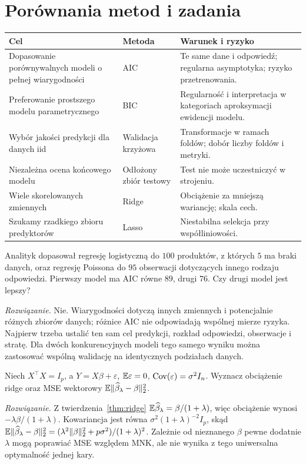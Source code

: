 \section{Porównania metod i zadania}
\begin{center}\small
\begin{tabular}{>{\raggedright\arraybackslash}p{}>{\raggedright\arraybackslash}p{}>{\raggedright\arraybackslash}p{}}
\toprule
\textbf{Cel} & \textbf{Metoda} & \textbf{Warunek i ryzyko}\\
\midrule
Dopasowanie porównywalnych modeli o pełnej wiarygodności & AIC & Te same dane i odpowiedź; regularna asymptotyka; ryzyko przetrenowania.\\
Preferowanie prostszego modelu parametrycznego & BIC & Regularność i interpretacja w kategoriach aproksymacji ewidencji modelu.\\
Wybór jakości predykcji dla danych iid & Walidacja krzyżowa & Transformacje w ramach foldów; dobór liczby foldów i metryki.\\
Niezależna ocena końcowego modelu & Odłożony zbiór testowy & Test nie może uczestniczyć w strojeniu.\\
Wiele skorelowanych zmiennych & Ridge & Obciążenie za mniejszą wariancję; skala cech.\\
Szukamy rzadkiego zbioru predyktorów & Lasso & Niestabilna selekcja przy współliniowości.\\
\bottomrule
\end{tabular}
\end{center}

\begin{zadanie}
Analityk dopasował regresję logistyczną do $100$ produktów,
z których $5$ ma braki danych, oraz regresję Poissona do
$95$ obserwacji dotyczących innego rodzaju odpowiedzi.
Pierwszy model ma AIC równe $89$, drugi $76$. Czy drugi
model jest lepszy?
\par\emph{Rozwiązanie.} Nie. Wiarygodności dotyczą innych
zmiennych i potencjalnie różnych zbiorów danych;
różnice AIC nie odpowiadają wspólnej mierze ryzyka.
Najpierw trzeba ustalić ten sam cel predykcji, rozkład
odpowiedzi, obserwacje i stratę. Dla dwóch konkurencyjnych
modeli tego samego wyniku można zastosować wspólną
walidację na identycznych podziałach danych.
\end{zadanie}

\begin{zadanie}
Niech $X^\top X=I_p$, a $Y=X\beta+\varepsilon$,
$\mathbb E\varepsilon=0$, $\operatorname{Cov}(\varepsilon)=\sigma^2I_n$.
Wyznacz obciążenie ridge oraz MSE wektorowy
$\mathbb E\|\widehat\beta_\lambda-\beta\|_2^2$.
\par\emph{Rozwiązanie.} Z twierdzenia~\ref{thm:ridge}
$\mathbb E\widehat\beta_\lambda=\beta/(1+\lambda)$,
więc obciążenie wynosi $-\lambda\beta/(1+\lambda)$.
Kowariancja jest równa
$\sigma^2(1+\lambda)^{-2}I_p$, skąd
$\mathbb E\|\widehat\beta_\lambda-\beta\|_2^2
=(\lambda^2\|\beta\|_2^2+p\sigma^2)/(1+\lambda)^2$.
Zależnie od nieznanego $\beta$ pewne dodatnie
$\lambda$ mogą poprawiać MSE względem MNK, ale nie
wynika z tego uniwersalna optymalność jednej kary.
\end{zadanie}

